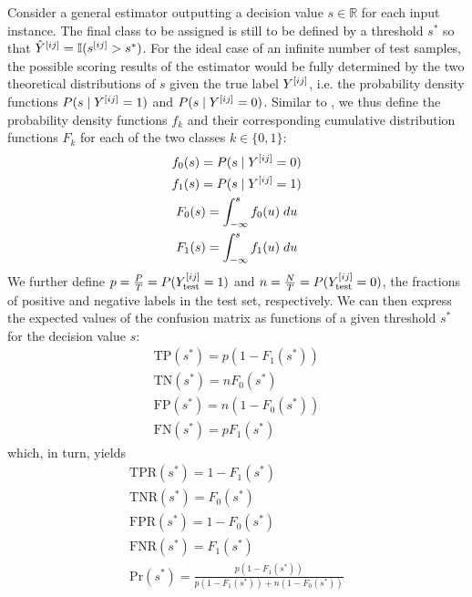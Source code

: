 Consider a general estimator outputting a decision value $s \in \mathbb{R}$ for each input instance. The final class to be assigned is still to be defined by a threshold $s^*$ so that $\hat Y^{[ij]} = \mathbb{I}(s^{[ij]} > s^*)$. For the ideal case of an infinite number of test samples, the possible scoring results of the estimator would be fully determined by the two theoretical distributions of $s$ given the true label $Y^{[ij]}$, i.e. the probability density functions $P(s \mid Y^{[ij]} = 1)$ and $P(s \mid Y^{[ij]} = 0)$. Similar to , we thus define the probability density functions $f_k$ and their corresponding cumulative distribution functions $F_k$ for each of the two classes $k \in \{0, 1\}$:
%
\begin{gather}
    f_0(s) = P(s \mid Y^{[ij]} = 0) \\
    f_1(s) = P(s \mid Y^{[ij]} = 1) \\
    F_0(s) = \int_{-\infty}^s f_0(u)\;du \\
    F_1(s) = \int_{-\infty}^s f_1(u)\;du
    \label{eq:ideal_confusion_matrix}
\end{gather}
%
We further define $p=\frac{P}{T}=P(Y_\text{test}^{[ij]}=1)$ and $n=\frac{N}{T}=P(Y_\text{test}^{[ij]}=0)$, the fractions of positive and negative labels in the test set, respectively. We can then express the expected values of the confusion matrix as functions of a given threshold $s^*$ for the decision value $s$:
%
\begin{gather}
    \text{TP}(s^*) = p (1 - F_1(s^*)) \\
    \text{TN}(s^*) = n F_0(s^*) \\
    \text{FP}(s^*) = n (1 - F_0(s^*)) \\
    \text{FN}(s^*) = p F_1(s^*)
\end{gather}
%
which, in turn, yields
%
\begin{gather}
    \text{TPR}(s^*) = 1 - F_1(s^*) \\
    \text{TNR}(s^*) = F_0(s^*) \\
    \text{FPR}(s^*) = 1 - F_0(s^*) \\
    \text{FNR}(s^*) = F_1(s^*) \\
    \text{Pr}(s^*) = \frac{p (1 - F_1(s^*))}{p (1 - F_1(s^*)) + n (1 - F_0(s^*))}
\end{gather}

